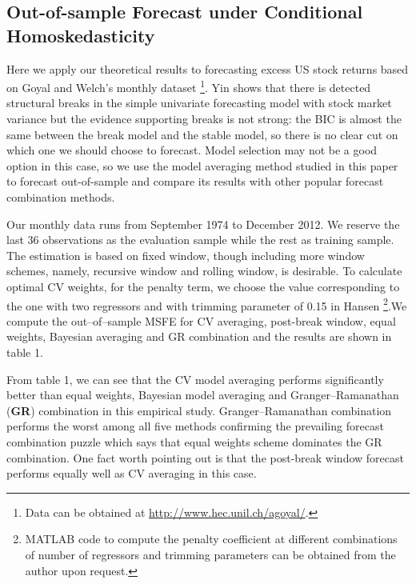 \documentclass[a4paper,12pt]{article}
\begin{document}
\subsection{Out-of-sample Forecast under Conditional Homoskedasticity}
Here we apply our theoretical results to forecasting excess US stock returns based on Goyal and Welch's \cite{goyal_welch_RFS2008} monthly dataset \footnote{Data can be obtained at \url{http://www.hec.unil.ch/agoyal/}.}. Yin \cite{yin2012} shows that there is detected structural breaks in the simple univariate forecasting model with stock market variance but the evidence supporting breaks is not strong: the BIC is almost the same between the break model and the stable model, so there is no clear cut on which one we should choose to forecast. Model selection may not be a good option in this case, so we use the model averaging method studied in this paper to forecast out-of-sample and compare its results with other popular forecast combination methods.

Our monthly data runs from September 1974 to December 2012. We reserve the last 36 observations as the evaluation sample while the rest as training sample. The estimation is based on fixed window, though including more window schemes, namely, recursive window and rolling window, is desirable. To calculate optimal CV weights, for the penalty term, we choose the value corresponding to the one with two regressors and with trimming parameter of 0.15 in Hansen \cite{hansen2009averaging} \footnote{MATLAB code to compute the penalty coefficient at different combinations of number of regressors and trimming parameters can be obtained from the author upon request.}.We compute the out--of--sample MSFE for CV averaging, post-break window, equal weights, Bayesian averaging and GR combination and the results are shown in table 1.

From table 1, we can see that the CV model averaging performs significantly better than equal weights, Bayesian model averaging and Granger--Ramanathan (\textbf{GR}) combination in this empirical study. Granger--Ramanathan combination performs the worst among all five methods confirming the prevailing forecast combination puzzle which says that equal weights scheme dominates the GR combination. One fact worth pointing out is that the post-break window forecast performs equally well as CV averaging in this case.
\end{document}
